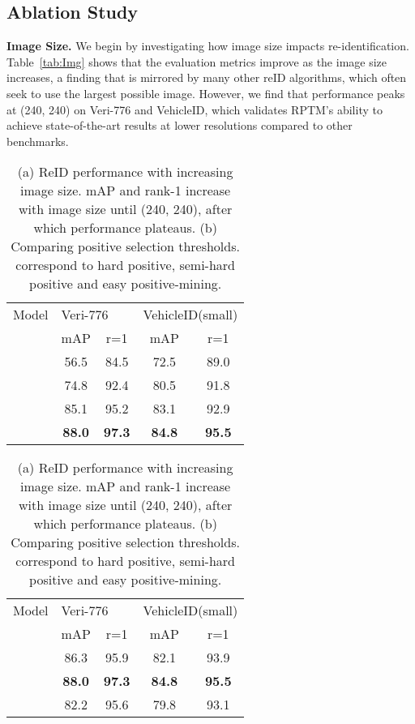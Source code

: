\documentclass[10pt,twocolumn,letterpaper]{article}
\begin{document}
\subsection{Ablation Study}
\textbf{Image Size.} We begin by investigating how image size impacts re-identification.  Table~\ref{tab:Img}
shows that the evaluation metrics improve as the image size increases, a finding that is mirrored by many other reID algorithms,
which often seek to use the largest possible image. However, we find that performance peaks at (240, 240) on Veri-776 and VehicleID, which validates RPTM's ability to achieve state-of-the-art results at lower resolutions compared to other benchmarks. 


\begin{table}[t]

    \begin{subtable}[h]{0.45\textwidth}
        \centering
        \begin{tabular}{c|cc|cc}
    \hline
    Model& \multicolumn{2}{l|}{Veri-776} & \multicolumn{2}{l}{VehicleID(small)}    \\
    & mAP & r=1 & mAP & r=1 \\
    \hline
     &56.5 & 84.5& 72.5&89.0\\
     & 74.8& 92.4& 80.5&91.8\\
     & 85.1& 95.2&83.1& 92.9\\
    &  \textbf{88.0} & \textbf{97.3}&\textbf{84.8}&\textbf{95.5}\\

     \hline
       \end{tabular}
       \caption{Image size ablation}
    \label{tab:Img}
    \end{subtable}
    \hfill
    \begin{subtable}[h]{0.45\textwidth}
        \centering
        \begin{tabular}{c|cc|cc}
    \hline
     Model& \multicolumn{2}{l|}{Veri-776} & \multicolumn{2}{l}{VehicleID(small)}    \\
    & mAP & r=1 & mAP & r=1 \\
    \hline

     & 86.3 & 95.9 & 82.1&93.9\\
       &  \textbf{88.0} & \textbf{97.3} & \textbf{84.8}& \textbf{95.5}\\
     & 82.2 & 95.6 & 79.8&93.1\\
    \hline
        \end{tabular}
        \caption{Thresholding ablation}
        \label{tab:thresh}
     \end{subtable}
     \caption{(a) ReID performance with increasing image size. mAP and rank-1 increase
with image size until (240, 240), after which performance plateaus. (b) Comparing   positive selection thresholds.  correspond to hard positive, semi-hard  positive and easy positive-mining.}
     \label{tab:ablation}
\end{table}
\end{document}
